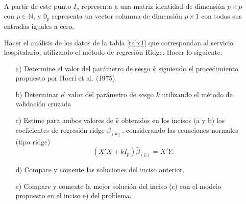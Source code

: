 \documentclass[10.5pt,notitlepage]{article}
\renewcommand{\qedsymbol}{$\blacksquare$}
\newcommand{\NN}{\mathbb{N}}
\theoremstyle{plain}
\newenvironment{rem}
  {\pushQED{\qed}\renewcommand{\qedsymbol}{$\triangle$}\remarkex}
  {\popQED\endremarkex}
\begin{document}
\begin{rem}
A partir de este punto \(I_{p}\) representa a una matriz identidad de dimensión \(p \times p\) con \(p \in \NN\), y \(0_p\) representa un vector columna de dimensión \(p \times 1\) con todas sus entradas iguales a cero.  
\end{rem}
\begin{exo}
Hacer
el análisis de los datos de la tabla \ref{tab:1} que correspondan al servicio hospitalario,
utilizando el método de regresión Ridge. Hacer lo siguiente:
\begin{itemize}
    \item[a)] Determine el valor del parámetro de sesgo \(\mathit{k}\) siguiendo el procedimiento propuesto por Hoerl et al. (1975).
    \item[b)] Determinar el valor del parámetro de sesgo \(\mathit{k}\) utilizando el método de validación cruzada
    \item[c)] Estime para ambos valores de \(\mathit{k}\) obtenidos en los incisos (a y b) los coeficientes de regresión ridge \(\beta_{(k)}\), considerando las ecuaciones normales (tipo ridge)
    \[
    (X'X + kI_{p})\hat{\beta}_{(k)} = X'Y. 
    \]
    \item[d)] Compare y comente las soluciones del inciso anterior. 
    \item[e)] Compare y comente la mejor solución del inciso (c) con el modelo propuesto en el inciso e) del problema.
\end{itemize}
\end{exo}
\end{document}
